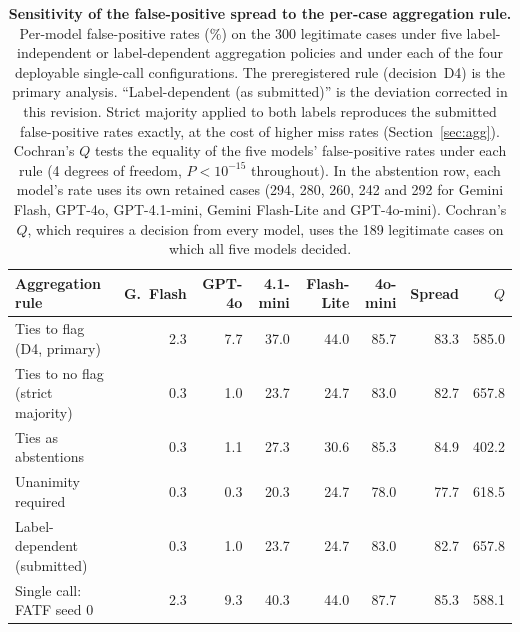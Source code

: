 \documentclass[pdflatex,sn-basic,Numbered]{sn-jnl}
\newcommand{\HLtext}[1]{\texthl{#1}}
\newcommand{\HLdel}[1]{\textcolor{HLink}{\sout{#1}}}
\newcommand{\HLtag}[1]{{\color{HLink}\bfseries [#1]~}}
\renewcommand{\HLtext}[1]{#1}\renewcommand{\HLdel}[1]{#1}%
\renewcommand{\HLtag}[1]{}}}
\begin{document}
\begin{table}[t]
\caption{\HLtag{New in revision}\textbf{Sensitivity of the false-positive spread to the per-case aggregation rule.} Per-model false-positive rates (\%) on the 300 legitimate cases under five label-independent or label-dependent aggregation policies and under each of the four deployable single-call configurations. The preregistered rule (decision~D4) is the primary analysis. ``Label-dependent (as submitted)'' is the deviation corrected in this revision. Strict majority applied to both labels reproduces the submitted false-positive rates exactly, at the cost of higher miss rates (Section~\ref{sec:agg}). Cochran's $Q$ tests the equality of the five models' false-positive rates under each rule (4 degrees of freedom, $P<10^{-15}$ throughout). In the abstention row, each model's rate uses its own retained cases (294, 280, 260, 242 and 292 for Gemini Flash, GPT-4o, GPT-4.1-mini, Gemini Flash-Lite and GPT-4o-mini). Cochran's $Q$, which requires a decision from every model, uses the 189 legitimate cases on which all five models decided.}\label{tab:agg}
\setlength{\tabcolsep}{3pt}
\begin{tabular*}{\textwidth}{@{\extracolsep\fill}lrrrrrrr}
\toprule
\HLtext{Aggregation rule} & \HLtext{G.}\ \HLtext{Flash} & \HLtext{GPT-4o} & \HLtext{4.1-mini} & \HLtext{Flash-Lite} & \HLtext{4o-mini} & \HLtext{Spread} & $Q$ \\
\midrule
\HLtext{Ties to flag (D4, primary)}                & \HLtext{2.3} & \HLtext{7.7} & \HLtext{37.0} & \HLtext{44.0} & \HLtext{85.7} & \HLtext{83.3} & \HLtext{585.0} \\
\HLtext{Ties to no flag (strict majority)}         & \HLtext{0.3} & \HLtext{1.0} & \HLtext{23.7} & \HLtext{24.7} & \HLtext{83.0} & \HLtext{82.7} & \HLtext{657.8} \\
\HLtext{Ties as abstentions}                       & \HLtext{0.3} & \HLtext{1.1} & \HLtext{27.3} & \HLtext{30.6} & \HLtext{85.3} & \HLtext{84.9} & \HLtext{402.2} \\
\HLtext{Unanimity required}                        & \HLtext{0.3} & \HLtext{0.3} & \HLtext{20.3} & \HLtext{24.7} & \HLtext{78.0} & \HLtext{77.7} & \HLtext{618.5} \\
\HLtext{Label-dependent (submitted)}               & \HLtext{0.3} & \HLtext{1.0} & \HLtext{23.7} & \HLtext{24.7} & \HLtext{83.0} & \HLtext{82.7} & \HLtext{657.8} \\
\midrule
\HLtext{Single call: FATF seed 0}                  & \HLtext{2.3} & \HLtext{9.3} & \HLtext{40.3} & \HLtext{44.0} & \HLtext{87.7} & \HLtext{85.3} & \HLtext{588.1} \\

\end{tabular*}
\end{table}
\end{document}
